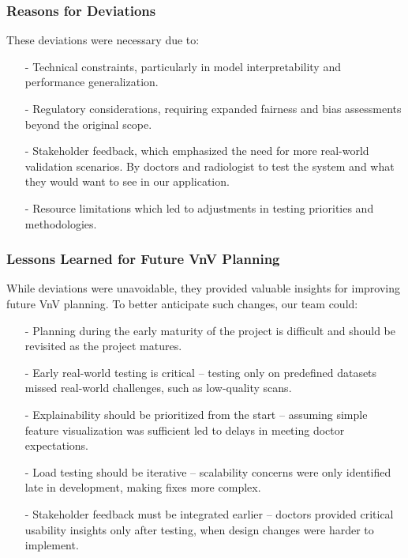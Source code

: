 \documentclass[12pt, titlepage]{article}
\begin{document}
\subsubsection*{Reasons for Deviations}
  \noindent These deviations were necessary due to:
  \begin{itemize}
  \item[-] Technical constraints, particularly in model interpretability and performance generalization.
  \item[-] Regulatory considerations, requiring expanded fairness and bias assessments beyond the original scope.
  \item[-] Stakeholder feedback, which emphasized the need for more real-world validation scenarios. By doctors and radiologist to test the system and what they would want to see in our application.
  \item[-] Resource limitations which led to adjustments in testing priorities and methodologies.
  \end{itemize}
  
\subsubsection*{Lessons Learned for Future VnV Planning}
  \noindent While deviations were unavoidable, they provided valuable insights for improving future VnV planning. To better anticipate such changes, our team could:
  \begin{itemize}
    \item[-] Planning during the early maturity of the project is difficult and should be revisited as the project matures.
    \item[-] Early real-world testing is critical – testing only on predefined datasets missed real-world challenges, such as low-quality scans.
    \item[-] Explainability should be prioritized from the start – assuming simple feature visualization was sufficient led to delays in meeting doctor expectations.
    \item[-] Load testing should be iterative – scalability concerns were only identified late in development, making fixes more complex.
    \item[-] Stakeholder feedback must be integrated earlier – doctors provided critical usability insights only after testing, when design changes were harder to implement.
    \end{itemize}
\end{document}
